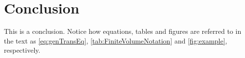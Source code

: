 \section{Conclusion}

This is a conclusion. Notice how equations, tables and figures are referred to in the text as \autoref{eq:genTransEq}, \autoref{tab:FiniteVolumeNotation} and \autoref{fig:example}, respectively.
